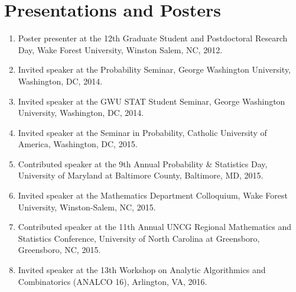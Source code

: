 \documentclass[12pt,letterpaper]{article}
\newenvironment{cventry}{\begin{minipage}[t]{\linewidth}}{\end{minipage}}
\begin{document}
	\section*{Presentations and Posters}
	\begin{enumerate}
		\item\begin{cventry} Poster presenter at the 12th Graduate Student and Postdoctoral Research Day, Wake Forest University, Winston Salem, NC, 2012.
		\par\end{cventry}
		\item\begin{cventry} Invited speaker at the Probability Seminar, George Washington University, Washington, DC, 2014.
		\par\end{cventry}
		\item\begin{cventry} Invited speaker at the GWU STAT Student Seminar, George Washington University, Washington, DC, 2014.
		\par\end{cventry}
		\item\begin{cventry} Invited speaker at the Seminar in Probability, Catholic University of America, Washington, DC, 2015.
		\par\end{cventry}
		\item\begin{cventry} Contributed speaker at the 9th Annual Probability \& Statistics Day, University of Maryland at Baltimore County, Baltimore, MD, 2015.
		\par\end{cventry}
		\item\begin{cventry} Invited speaker at the Mathematics Department Colloquium, Wake Forest University, Winston-Salem, NC, 2015.
		\par\end{cventry}
		\item\begin{cventry} Contributed speaker at the 11th Annual UNCG Regional Mathematics and Statistics Conference, University of North Carolina at Greensboro, Greensboro, NC, 2015.
		\par\end{cventry}
		\item\begin{cventry} Invited speaker at the 13th Workshop on Analytic Algorithmics and Combinatorics (ANALCO 16), Arlington, VA, 2016.

\end{cventry}
\end{enumerate}
\end{document}

